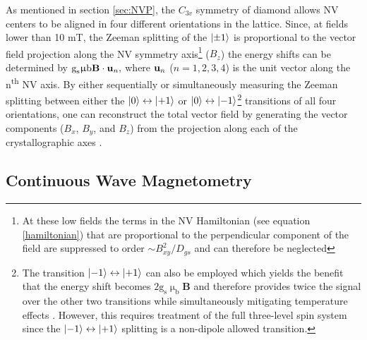 As mentioned in section \ref{sec:NVP}, the $C_{3v}$ symmetry of diamond allows NV centers to be aligned in four different orientations in the lattice. Since, at fields lower than 10 mT, the Zeeman splitting of the $\ket{\pm 1}$ is proportional to the vector field projection along the NV symmetry axis\footnote{At these low fields the terms in the NV Hamiltonian (see equation \ref{hamiltonian}) that are proportional to the perpendicular component of the field are suppressed to order $\sim B_{xy}^2 / D_{gs}$ and can therefore be neglected\cite{taylor2008high}} ($B_z$) the energy shifts can be determined by $\text{g}_\text{s} \upmu \text{b}\textbf{B} \cdot \textbf{\text{u}}_n,$ where $\textbf{\text{u}}_n$ ($n = 1,2,3,4$) is the unit vector along the n\textsuperscript{th} NV axis. By either sequentially or simultaneously measuring the Zeeman splitting between either the $\ket{0} \leftrightarrow \ket{+1}$ or $\ket{0} \leftrightarrow \ket{-1}$\footnote{The transition $\ket{-1} \leftrightarrow \ket{+1}$ can also be employed which yields the benefit that the energy shift becomes $2\text{g}_\text{s}\upmu_\text{b}\textbf{B}$ and therefore provides twice the signal over the other two transitions while simultaneously mitigating temperature effects \cite{neumann2013high}. However, this requires treatment of the full three-level spin system since the $\ket{-1} \leftrightarrow \ket{+1}$ splitting is a non-dipole allowed transition.} transitions of all four orientations, one can reconstruct the total vector field by generating the vector components ($B_x$, $B_y$, and $B_z$) from the projection along each of the crystallographic axes \cite{kitazawa2017vector,schloss2018simultaneous}.

\subsection{Continuous Wave Magnetometry}

